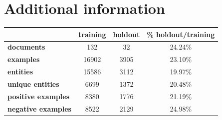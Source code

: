 \documentclass[]{interact}
\theoremstyle{plain}%
\theoremstyle{definition}
\theoremstyle{remark}
\begin{document}
\clearpage

\appendix

\section{Additional information}

\begin{table}[ht]
    \centering
    {
        \begin{tabular}{lccc}
            \toprule
                                          & \textbf{training} & \textbf{holdout} & \textbf{\% holdout/training} \\
            \midrule
            \textbf{documents}         & 132               & 32               & 24.24\%                   \\
            \textbf{examples}          & 16902             & 3905             & 23.10\%                   \\
            \textbf{entities}          & 15586             & 3112             & 19.97\%                   \\
            \textbf{unique entities}   & 6699              & 1372             & 20.48\%                   \\
            \textbf{positive examples} & 8380              & 1776             & 21.19\%                   \\
            \textbf{negative examples} & 8522              & 2129             & 24.98\%                   \\
            \bottomrule
        \end{tabular}
    }
    \label{tab:training-holdout-set-distribution-annex}
\end{table}
\end{document}
